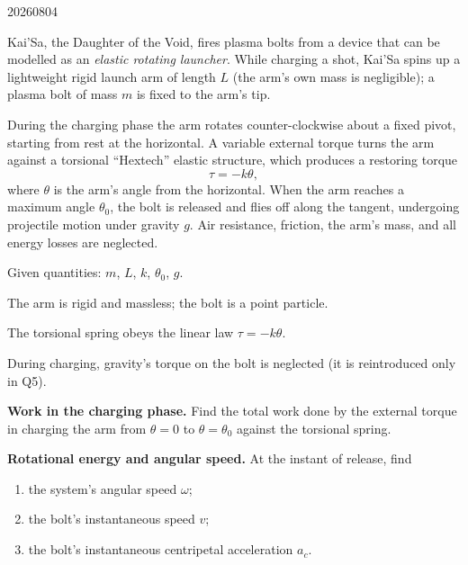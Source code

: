 

\begin{problem}{20260804}

Kai'Sa, the Daughter of the Void, fires plasma bolts from a device that can be modelled as an \emph{elastic rotating launcher}.  While charging a shot, Kai'Sa spins up a lightweight rigid launch arm of length $L$ (the arm's own mass is negligible); a plasma bolt of mass $m$ is fixed to the arm's tip.

During the charging phase the arm rotates counter-clockwise about a fixed pivot, starting from rest at the horizontal.  A variable external torque turns the arm against a torsional ``Hextech'' elastic structure, which produces a restoring torque
\[
  \tau = -k\theta ,
\]
where $\theta$ is the arm's angle from the horizontal.  When the arm reaches a maximum angle $\theta_{0}$, the bolt is released and flies off along the tangent, undergoing projectile motion under gravity $g$.  Air resistance, friction, the arm's mass, and all energy losses are neglected.

Given quantities: $m$, $L$, $k$, $\theta_{0}$, $g$.

\begin{assumptions}
  \item The arm is rigid and massless; the bolt is a point particle.
  \item The torsional spring obeys the linear law $\tau = -k\theta$.
  \item During charging, gravity's torque on the bolt is neglected (it is reintroduced only in Q5).
\end{assumptions}

\begin{questions}
  \item \textbf{Work in the charging phase.}
        Find the total work done by the external torque in charging the arm from $\theta = 0$ to $\theta = \theta_{0}$ against the torsional spring.

  \item \textbf{Rotational energy and angular speed.}
        At the instant of release, find
        \begin{enumerate}[label=\roman*.]
          \item the system's angular speed $\omega$;
          \item the bolt's instantaneous speed $v$;
          \item the bolt's instantaneous centripetal acceleration $a_c$.
        \end{enumerate}


\end{questions}
\end{problem}
